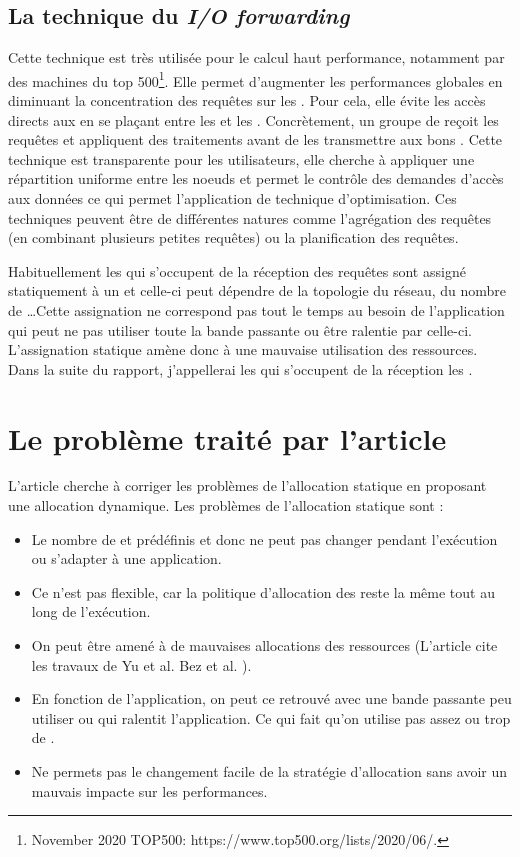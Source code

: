 \documentclass[10pt, a4paper]{article}
\begin{document}
\subsection{La technique du \emph{I/O forwarding}}

Cette technique est très utilisée pour le calcul haut performance, notamment par des machines du top 500\footnote[1]{November 2020 TOP500: https://www.top500.org/lists/2020/06/.}. Elle permet d'augmenter les performances globales en diminuant la concentration des requêtes sur les \noeudsIO{}. Pour cela, elle évite les accès directs aux \noeudsIO{} en se plaçant entre les \noeudsDeCalculs{} et les \noeudsIO{}. Concrètement, un groupe de \noeudsIO{} reçoit les requêtes et appliquent des traitements avant de les transmettre aux bons \noeudsIO{}. Cette technique est transparente pour les utilisateurs, elle cherche à appliquer une répartition uniforme entre les noeuds et permet le contrôle des demandes d'accès aux données ce qui permet l'application de technique d'optimisation. Ces techniques peuvent être de différentes natures comme l'agrégation des requêtes (en combinant plusieurs petites requêtes) ou la planification des requêtes.

Habituellement les \noeudsIO{} qui s'occupent de la réception des requêtes sont assigné statiquement à un \noeudDeCalculs{} et celle-ci peut dépendre de la topologie du réseau, du nombre de \noeudsIO{}\dots Cette assignation ne correspond pas tout le temps au besoin de l'application qui peut ne pas utiliser toute la bande passante ou être ralentie par celle-ci. L'assignation statique amène donc à une mauvaise utilisation des ressources. Dans la suite du rapport, j'appellerai les \noeudsIO{} qui s'occupent de la réception les \noeudsIOforwarding{}.

\section{Le problème traité par l'article}

L'article cherche à corriger les problèmes de l'allocation statique en proposant une allocation dynamique.
Les problèmes de l'allocation statique sont :
\begin{itemize}
  \item Le nombre de \noeudsIO{} et prédéfinis et donc ne peut pas changer pendant l'exécution ou s'adapter à une application.
  \item Ce n'est pas flexible, car la politique d'allocation des \noeudsIO{} reste la même tout au long de l'exécution.
  \item On peut être amené à de mauvaises allocations des ressources (L'article cite les travaux de Yu et al. \cite{8322970} Bez et al. \cite{9307161}).
  \item En fonction de l'application, on peut ce retrouvé avec une bande passante peu utiliser ou qui ralentit l'application. Ce qui fait qu'on utilise pas assez ou trop de \noeudsIO{}.
  \item Ne permets pas le changement facile de la stratégie d'allocation sans avoir un mauvais impacte sur les performances.
\end{itemize}
\end{document}
